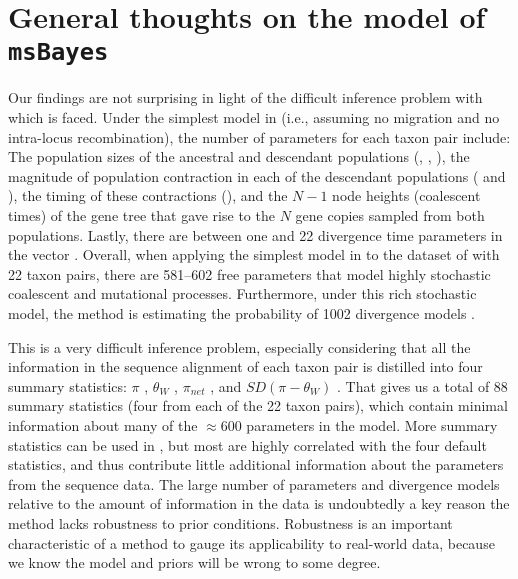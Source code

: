\section{General thoughts on the model of \texttt{msBayes}}
Our findings are not surprising in light of the difficult inference problem
with which \msb is faced.
Under the simplest model in \msb (i.e., assuming no migration and no
intra-locus recombination), the number of parameters for each taxon pair
include:
The population sizes of the ancestral and descendant populations
(\ancestralTheta{}, , ),
the magnitude of population contraction in each of the descendant
populations ( and ), the
timing of these contractions (\bottleTime{}), and the $N-1$ node heights
(coalescent times) of the gene tree that gave rise to the $N$ gene
copies sampled from both populations.
Lastly, there are between one and 22 divergence time parameters \divt{} in
the vector \divtvector.
Overall, when applying the simplest model in \msb to the dataset of
\citet{Oaks2012} with 22 taxon pairs, there are 581--602 free parameters
that model highly stochastic coalescent and mutational processes.
Furthermore, under this rich stochastic model, the method is estimating the
probability of 1002 divergence models \citep[i.e., the number of integer
partitions of $Y=22$;][]{Oaks2012}.

This is a very difficult inference problem, especially considering that all the
information in the sequence alignment of each taxon pair is distilled into four
summary statistics:
$\pi$ \citep{Tajima1983}, $\theta_W$ \citep{Watterson1975}, $\pi_{net}$
\citep{Takahata1985}, and $SD(\pi-\theta_W)$ \citep{Tajima1989}.
That gives us a total of 88 summary statistics (four from each of the 22 taxon
pairs), which contain minimal information about many of the $\approx 600$
parameters in the model.
More summary statistics can be used in \msb, but most are highly correlated
with the four default statistics, and thus contribute little additional
information about the parameters from the sequence data.
The large number of parameters and divergence models relative to the amount of
information in the data is undoubtedly a key reason the method lacks robustness
to prior conditions.
Robustness is an important characteristic of a method to gauge its
applicability to real-world data, because we know the model and priors will be
wrong to some degree.


